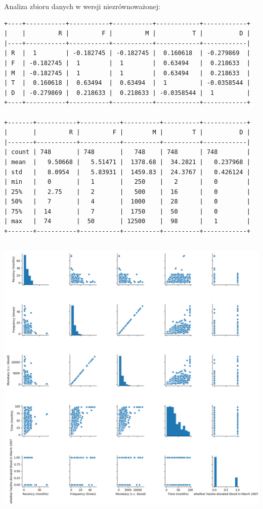 \documentclass[11pt, a4paper, notitlepage]{report}
\begin{document}
Analiza zbioru danych w wersji niezrównoważonej:
\begin{verbatim}
+----+-----------+-----------+-----------+------------+------------+
|    |         R |         F |         M |          T |          D |
|----+-----------+-----------+-----------+------------+------------|
| R  |  1        | -0.182745 | -0.182745 |  0.160618  | -0.279869  |
| F  | -0.182745 |  1        |  1        |  0.63494   |  0.218633  |
| M  | -0.182745 |  1        |  1        |  0.63494   |  0.218633  |
| T  |  0.160618 |  0.63494  |  0.63494  |  1         | -0.0358544 |
| D  | -0.279869 |  0.218633 |  0.218633 | -0.0358544 |  1         |
+----+-----------+-----------+-----------+------------+------------+

+-------+-----------+-----------+----------+----------+------------+
|       |         R |         F |        M |        T |          D |
|-------+-----------+-----------+----------+----------+------------|
| count | 748       | 748       |   748    | 748      | 748        |
| mean  |   9.50668 |   5.51471 |  1378.68 |  34.2821 |   0.237968 |
| std   |   8.0954  |   5.83931 |  1459.83 |  24.3767 |   0.426124 |
| min   |   0       |   1       |   250    |   2      |   0        |
| 25%   |   2.75    |   2       |   500    |  16      |   0        |
| 50%   |   7       |   4       |  1000    |  28      |   0        |
| 75%   |  14       |   7       |  1750    |  50      |   0        |
| max   |  74       |  50       | 12500    |  98      |   1        |
+-------+-----------+-----------+----------+----------+------------+
\end{verbatim}

\includegraphics[width=400pt,height=400pt]{graphics/correlation_1} \\
\end{document}
